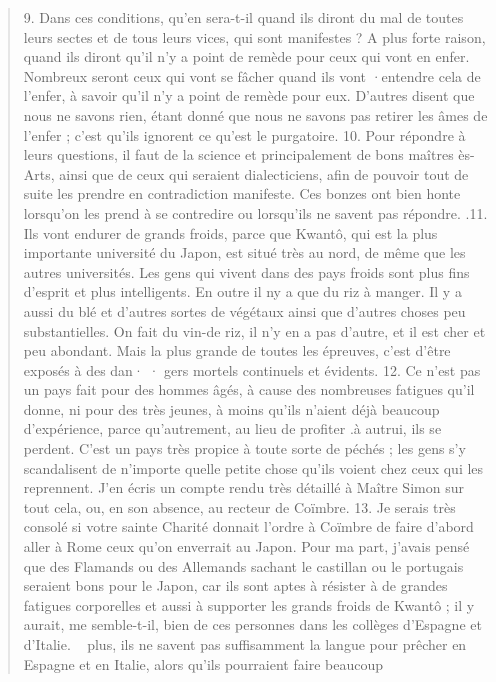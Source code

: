 \begin{quote}
\begin{Synthesis}
\begin{quote}
\end{quote}
\end{Synthesis}
9. Dans ces conditions, qu'en sera-t-il quand ils diront du mal
de toutes leurs sectes et de tous leurs vices, qui sont manifestes ?
A plus forte raison, quand ils diront qu'il n'y a point de remède
pour ceux qui vont en enfer. Nombreux seront ceux qui vont se
fâcher quand ils vont ·entendre cela de l'enfer, à savoir qu'il n'y
a point de remède pour eux. D'autres disent que nous ne savons
rien, étant donné que nous ne savons pas retirer les âmes de
l'enfer ; c'est qu'ils ignorent ce qu'est le purgatoire.
10. Pour répondre à leurs questions, il faut de la science et principalement
de bons maîtres ès-Arts, ainsi que de ceux qui seraient
dialecticiens, afin de pouvoir tout de suite les prendre en contradiction
manifeste. Ces bonzes ont bien honte lorsqu'on les prend
à se contredire ou lorsqu'ils ne savent pas répondre.
.11. Ils vont endurer de grands froids, parce que Kwantô, qui est
    la plus importante université du Japon, est situé très au nord, de
même que les autres universités. Les gens qui vivent dans des pays
froids sont plus fins d'esprit et plus intelligents. En outre il ny a
que du riz à manger. Il y a aussi du blé et d'autres sortes de végétaux
ainsi que d'autres choses peu substantielles. On fait du vin-de
riz, il n'y en a pas d'autre, et il est cher et peu abondant. Mais la
plus grande de toutes les épreuves, c'est d'être exposés à des dan· ·
gers mortels continuels et évidents.
12. Ce n'est pas un pays fait pour des hommes âgés, à cause des
nombreuses fatigues qu'il donne, ni pour des très jeunes, à moins
qu'ils n'aient déjà beaucoup d'expérience, parce qu'autrement, au
lieu de profiter .à autrui, ils se perdent. C'est un pays très propice
à toute sorte de péchés ; les gens s'y scandalisent de n'importe
quelle petite chose qu'ils voient chez ceux qui les reprennent. J'en
écris un compte rendu très détaillé à Maître Simon sur tout cela,
ou, en son absence, au recteur de Coïmbre.
13. Je serais très consolé si votre sainte Charité donnait l'ordre
à Coïmbre de faire d'abord aller à Rome ceux qu'on enverrait au
Japon. Pour ma part, j'avais pensé que des Flamands ou des Allemands
sachant le castillan ou le portugais seraient bons pour le
Japon, car ils sont aptes à résister à de grandes fatigues corporelles
et aussi à supporter les grands froids de Kwantô ; il y aurait,
me semble-t-il, bien de ces personnes dans les collèges d'Espagne
et d'Italie. ~ plus, ils ne savent pas suffisamment la langue pour
prêcher en Espagne et en Italie, alors qu'ils pourraient faire beaucoup

\end{quote}
